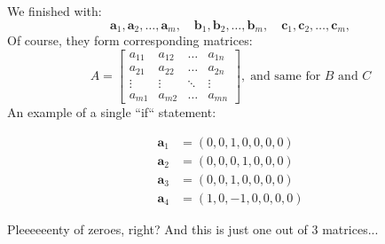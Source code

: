 \documentclass{zkdl-presentation-template}
\begin{document}
    \begin{frame}
        We finished with:
        \begin{equation*}
            \boldsymbol{a}_1, \boldsymbol{a}_2, \dots, \boldsymbol{a}_m, \quad
            \boldsymbol{b}_1, \boldsymbol{b}_2, \dots, \boldsymbol{b}_m, \quad
            \boldsymbol{c}_1, \boldsymbol{c}_2, \dots, \boldsymbol{c}_m, 
        \end{equation*}
        \pause
        Of course, they form corresponding matrices:
        \begin{equation*}
            A = \begin{bmatrix}
                a_{11} & a_{12} & \dots & a_{1n} \\
                a_{21} & a_{22} & \dots & a_{2n} \\
                \vdots & \vdots & \ddots & \vdots \\
                a_{m1} & a_{m2} & \dots & a_{mn}
            \end{bmatrix}, \;
            \text{and same for $B$ and $C$}
        \end{equation*}
        \pause
        An example of a single ``if`` statement:
        \begin{center}
        \begin{minipage}{0.4\textwidth}
        \vspace{-15pt}
        {\small \begin{align*}
            \boldsymbol{a}_1 &= (0, 0, 1, 0, 0, 0, 0) \\
            \boldsymbol{a}_2 &= (0, 0, 0, 1, 0, 0, 0) \\
            \boldsymbol{a}_3 &= (0, 0, 1, 0, 0, 0, 0) \\
            \boldsymbol{a}_4 &= (1, 0, -1, 0, 0, 0, 0)
        \end{align*}}
        \end{minipage}
        \begin{minipage}{0.5\textwidth}
        \end{minipage}
        \end{center}
            
        \pause
        Pleeeeeenty of zeroes, right? And this is just one out of 3 matrices...
    \end{frame}
\end{document}
